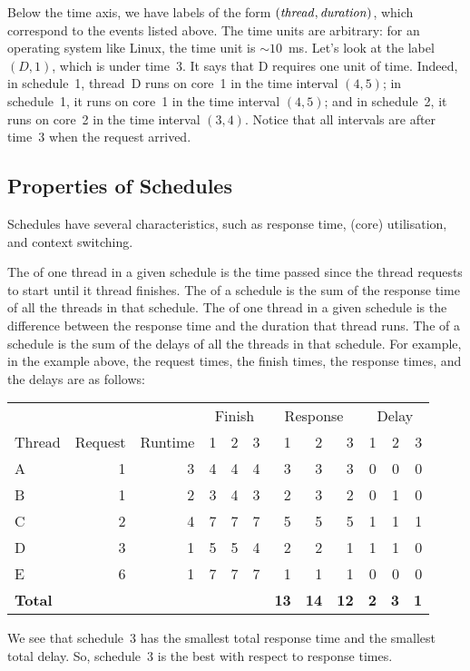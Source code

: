 Below the time axis, we have labels of the form $({\it thread},{\it duration})$,
  which correspond to the events listed above.
The time units are arbitrary:
  for an operating system like Linux, the time unit is $\sim10$~ms.
Let's look at the label $(D,1)$, which is under time~$3$.
It says that D requires one unit of time.
Indeed, in schedule~1, thread~D runs on core~1 in the time interval $(4,5)$;
  in schedule~1, it runs on core~1 in the time interval $(4,5)$;
  and in schedule~2, it runs on core~2 in the time interval $(3,4)$.
Notice that all intervals are after time~$3$ when the request arrived.

\subsection*{Properties of Schedules}

Schedules have several characteristics,
  such as response time, (core) utilisation, and context switching.

The  of one thread in a given schedule
  is the time passed since the thread requests to start until it thread finishes.
The  of a schedule
  is the sum of the response time of all the threads in that schedule.
The  of one thread in a given schedule
  is the difference between the response time and the duration that thread runs.
The  of a schedule
  is the sum of the delays of all the threads in that schedule.
For example, in the example above,
  the request times, the finish times, the response times, and the delays
  are as follows:
\begin{center}
\begin{tabular}{@{}lrrrrrrrrrrr@{}}
\toprule
  & & &
  \multicolumn{3}{c}{Finish} &
  \multicolumn{3}{c}{Response} &
  \multicolumn{3}{c}{Delay} 
  \\
    \cmidrule(lr){4-6} \cmidrule(lr){7-9} \cmidrule(l){10-12}
Thread  & Request & Runtime & 1 & 2 & 3 & 1 & 2 & 3 & 1 & 2 & 3 \\
\midrule
A & 1 & 3 & 4 & 4 & 4 & 3 & 3 & 3 & 0 & 0 & 0 \\
B & 1 & 2 & 3 & 4 & 3 & 2 & 3 & 2 & 0 & 1 & 0 \\
C & 2 & 4 & 7 & 7 & 7 & 5 & 5 & 5 & 1 & 1 & 1 \\
D & 3 & 1 & 5 & 5 & 4 & 2 & 2 & 1 & 1 & 1 & 0 \\
E & 6 & 1 & 7 & 7 & 7 & 1 & 1 & 1 & 0 & 0 & 0 \\
{\bf Total} & & & & & & \bf 13 & \bf 14 & \bf 12 & \bf 2 & \bf 3 & \bf 1 \\
\bottomrule
\end{tabular}
\end{center}
We see that schedule~3 has the smallest total response time
  and the smallest total delay.
So, schedule~3 is the best with respect to response times.

